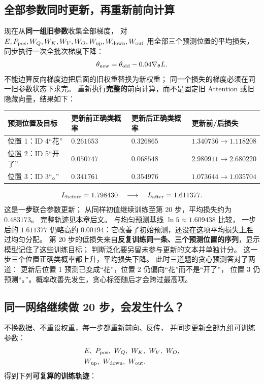 \subsection{全部参数同时更新，再重新前向计算}

现在从\textbf{同一组旧参数}收集全部梯度，
对 $E,P_{\rm pos},W_Q,W_K,W_V,W_O,W_{\rm up},W_{\rm down},W_{\rm out}$
用全部三个预测位置的平均损失，同步执行一次全批次梯度下降：
\[
\theta_{\rm new}=\theta_{\rm old}-0.04\nabla_\theta L.
\]
不能边算反向梯度边把后面的旧权重替换为新权重；
同一个损失的梯度必须在同一旧参数状态下求完。
重新执行\textbf{完整的}前向计算，而不是固定旧 Attention
或旧隐藏向量，结果如下：

\begin{center}\small
{}
\begin{tabularx}{\linewidth}{@{}>{\raggedright\arraybackslash}p{34mm}>{\raggedright\arraybackslash}p{23mm}>{\raggedright\arraybackslash}p{27mm}>{\raggedright\arraybackslash}X@{}}
\toprule
预测位置及目标 & 更新前正确类概率 & 更新后正确类概率 & 更新前/后损失\\\midrule
位置 1：ID 4“花” & $0.261653$ & $0.326865$ & $1.340736\to1.118208$\\
位置 2：ID 5“开了” & $0.050747$ & $0.068548$ & $2.980911\to2.680220$\\
位置 3：ID 3“。” & $0.341761$ & $0.354976$ & $1.073644\to1.035704$\\
\bottomrule
\end{tabularx}
\end{center}
\[
\boxed{L_{\rm before}=1.798430\quad\longrightarrow\quad
L_{\rm after}=1.611377.}
\]
这是一\textbf{步}联合参数更新；
从同样初值继续训练至第 20 步，平均损失约为 $0.483173$。
完整轨迹见本章后文。
与\hyperref[concept:uniform-baseline]{均匀预测基线} $\ln5\approx1.609438$ 比较，
一步后的 $1.611377$ 仍略高约 $0.00194$：它改善了初始预测，还没在这项平均损失上胜过均匀分配。
第 20 步的低损失来自\textbf{反复训练同一条、三个预测位置的序列}，显示模型记住了这些训练目标；
判断泛化要另留未参与更新的文本并单独计分。
这一步三个位置正确类概率都上升，平均损失下降。
此时三道题的贪心预测答对了两道：
更新后位置 1 预测已变成“花”，位置 2 仍偏向“花”而不是“开了”，
位置 3 仍预测“。”。概率改善先发生，贪心标签随后才会跨过最高项。

\subsection{同一网络继续做 20 步，会发生什么？}

不换数据、不重设权重，每一步都重新前向、反传，
并同步更新全部九组可训练参数：
\[
\begin{aligned}
&E,\ P_{\rm pos},\ W_Q,\ W_K,\ W_V,\ W_O,\\
&W_{\rm up},\ W_{\rm down},\ W_{\rm out}.
\end{aligned}
\]
得到下列\textbf{可复算的训练轨迹}：

